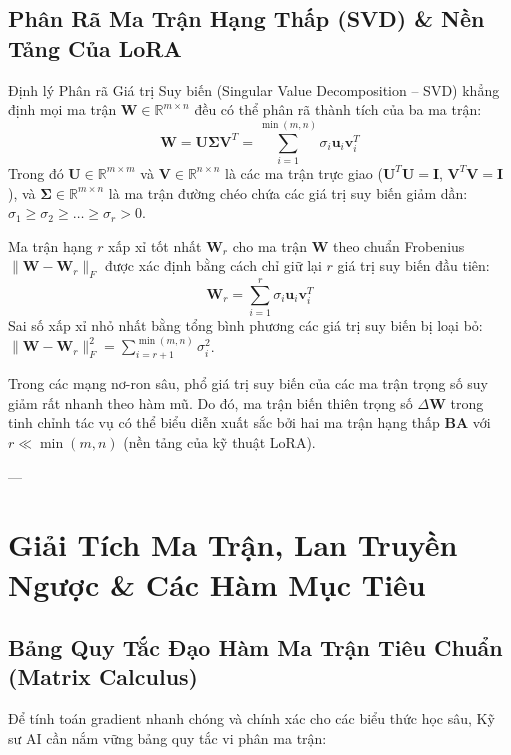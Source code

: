 \subsection{Phân Rã Ma Trận Hạng Thấp (SVD) \& Nền Tảng Của LoRA}
Định lý Phân rã Giá trị Suy biến (Singular Value Decomposition -- SVD) khẳng định mọi ma trận $\mathbf{W} \in \mathbb{R}^{m \times n}$ đều có thể phân rã thành tích của ba ma trận:
\begin{equation}
\mathbf{W} = \mathbf{U} \mathbf{\Sigma} \mathbf{V}^T = \sum_{i=1}^{\min(m, n)} \sigma_i \mathbf{u}_i \mathbf{v}_i^T
\label{eq:svd-theorem}
\end{equation}
Trong đó $\mathbf{U} \in \mathbb{R}^{m \times m}$ và $\mathbf{V} \in \mathbb{R}^{n \times n}$ là các ma trận trực giao ($\mathbf{U}^T \mathbf{U} = \mathbf{I}$, $\mathbf{V}^T \mathbf{V} = \mathbf{I}$), và $\mathbf{\Sigma} \in \mathbb{R}^{m \times n}$ là ma trận đường chéo chứa các giá trị suy biến giảm dần: $\sigma_1 \ge \sigma_2 \ge \dots \ge \sigma_r > 0$.

\begin{theorem}
Ma trận hạng $r$ xấp xỉ tốt nhất $\mathbf{W}_r$ cho ma trận $\mathbf{W}$ theo chuẩn Frobenius $\|\mathbf{W} - \mathbf{W}_r\|_F$ được xác định bằng cách chỉ giữ lại $r$ giá trị suy biến đầu tiên:
\begin{equation}
\mathbf{W}_r = \sum_{i=1}^r \sigma_i \mathbf{u}_i \mathbf{v}_i^T
\end{equation}
Sai số xấp xỉ nhỏ nhất bằng tổng bình phương các giá trị suy biến bị loại bỏ: $\|\mathbf{W} - \mathbf{W}_r\|_F^2 = \sum_{i=r+1}^{\min(m,n)} \sigma_i^2$.
\end{theorem}

Trong các mạng nơ-ron sâu, phổ giá trị suy biến của các ma trận trọng số suy giảm rất nhanh theo hàm mũ. Do đó, ma trận biến thiên trọng số $\Delta \mathbf{W}$ trong tinh chỉnh tác vụ có thể biểu diễn xuất sắc bởi hai ma trận hạng thấp $\mathbf{B} \mathbf{A}$ với $r \ll \min(m, n)$ (nền tảng của kỹ thuật LoRA).

---

\section{Giải Tích Ma Trận, Lan Truyền Ngược \& Các Hàm Mục Tiêu}
\label{sec:calculus-optimization}

\subsection{Bảng Quy Tắc Đạo Hàm Ma Trận Tiêu Chuẩn (Matrix Calculus)}
Để tính toán gradient nhanh chóng và chính xác cho các biểu thức học sâu, Kỹ sư AI cần nắm vững bảng quy tắc vi phân ma trận:

